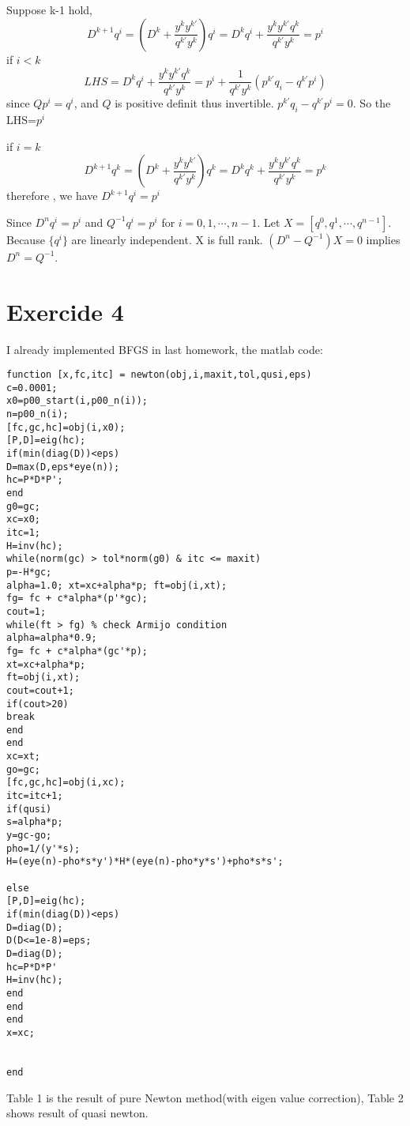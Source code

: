 \documentclass[12pt,a4paper]{article}
\begin{document}
Suppose k-1 hold,\[
D^{k+1}q^i=(D^{k}+\frac{y^ky^{k'}}{q^{k'}y^k})q^i=D^{k}q^i+\frac{y^ky^{k'}q^k}{q^{k'}y^k}=p^i
\]
if $i<k$ \[
LHS= D^{k}q^i+\frac{y^ky^{k'}q^k}{q^{k'}y^k}=p^i+\frac{1}{q^{k'}y^k}(p^{k'}q_i-q^{k'}p^i)
\]
since $Qp^i=q^i$, and $Q$ is positive definit thus invertible. $p^{k'}q_i-q^{k'}p^i=0$. So the LHS=$p^i$

if $i=k$\[
D^{k+1}q^k=(D^k+\frac{y^ky^{k'}}{q^{k'}y^k})q^k=D^kq^k+\frac{y^ky^{k'}q^k}{q^{k'}y^k}=p^k
\]
therefore , we have $D^{k+1}q^i=p^i$

Since $D^nq^i=p^i$ and $Q^{-1}q^i=p^i$ for $i=0,1,\cdots,n-1$. Let $X=[q^0, q^1, \cdots,q^{n-1}]$. Because $\{q^i\}$ are linearly independent. X is full rank. $(D^n-Q^{-1})X=0$ implies $D^n=Q^{-1}$.

\section*{Exercide 4}
I already implemented BFGS in last homework, the matlab code:
\begin{verbatim}
function [x,fc,itc] = newton(obj,i,maxit,tol,qusi,eps)
c=0.0001;
x0=p00_start(i,p00_n(i));
n=p00_n(i);
[fc,gc,hc]=obj(i,x0); 
[P,D]=eig(hc);
if(min(diag(D))<eps)
D=max(D,eps*eye(n));
hc=P*D*P';
end
g0=gc;
xc=x0;
itc=1;
H=inv(hc);
while(norm(gc) > tol*norm(g0) & itc <= maxit)
p=-H*gc;
alpha=1.0; xt=xc+alpha*p; ft=obj(i,xt);
fg= fc + c*alpha*(p'*gc);
cout=1;
while(ft > fg) % check Armijo condition
alpha=alpha*0.9;
fg= fc + c*alpha*(gc'*p);
xt=xc+alpha*p;
ft=obj(i,xt);
cout=cout+1;
if(cout>20)
break
end
end
xc=xt;
go=gc;
[fc,gc,hc]=obj(i,xc);
itc=itc+1;
if(qusi)
s=alpha*p;
y=gc-go;
pho=1/(y'*s);
H=(eye(n)-pho*s*y')*H*(eye(n)-pho*y*s')+pho*s*s';

else
[P,D]=eig(hc);
if(min(diag(D))<eps)
D=diag(D);          
D(D<=1e-8)=eps;       
D=diag(D); 
hc=P*D*P'
H=inv(hc);
end
end   
end
x=xc;


end
\end{verbatim}
Table 1 is the result of pure Newton method(with eigen value correction), Table 2 shows result of quasi newton.
\end{document}
